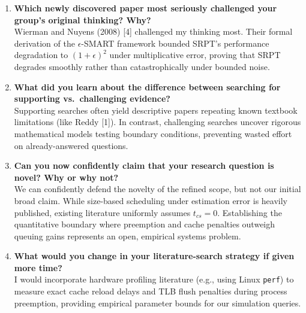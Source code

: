\documentclass[11pt]{article}
\newcommand{\topicTitle}[1]{
    \vspace{0.5em}\noindent{\fontsize{11.5}{13.8}\selectfont \textbf{#1}}\par\vspace{0.25em}
}
\begin{document}
\vspace{0.1em}
\topicTitle{J. Student 2: Sandeep (MT26MCS032)}
{\small
\begin{enumerate}[leftmargin=1.2em, itemsep=0.04em, parsep=0pt]
    \item \textbf{Which newly discovered paper most seriously challenged your group's original thinking? Why?} \\
    Wierman and Nuyens (2008) [4] challenged my thinking most. Their formal derivation of the $\epsilon$-SMART framework bounded SRPT's performance degradation to $(1+\epsilon)^2$ under multiplicative error, proving that SRPT degrades smoothly rather than catastrophically under bounded noise.

    \item \textbf{What did you learn about the difference between searching for supporting vs.\ challenging evidence?} \\
    Supporting searches often yield descriptive papers repeating known textbook limitations (like Reddy [1]). In contrast, challenging searches uncover rigorous mathematical models testing boundary conditions, preventing wasted effort on already-answered questions.

    \item \textbf{Can you now confidently claim that your research question is novel? Why or why not?} \\
    We can confidently defend the novelty of the refined scope, but not our initial broad claim. While size-based scheduling under estimation error is heavily published, existing literature uniformly assumes $t_{cs}=0$. Establishing the quantitative boundary where preemption and cache penalties outweigh queuing gains represents an open, empirical systems problem.

    \item \textbf{What would you change in your literature-search strategy if given more time?} \\
    I would incorporate hardware profiling literature (e.g., using Linux \texttt{perf}) to measure exact cache reload delays and TLB flush penalties during process preemption, providing empirical parameter bounds for our simulation queries.
\end{enumerate}
}
\end{document}
